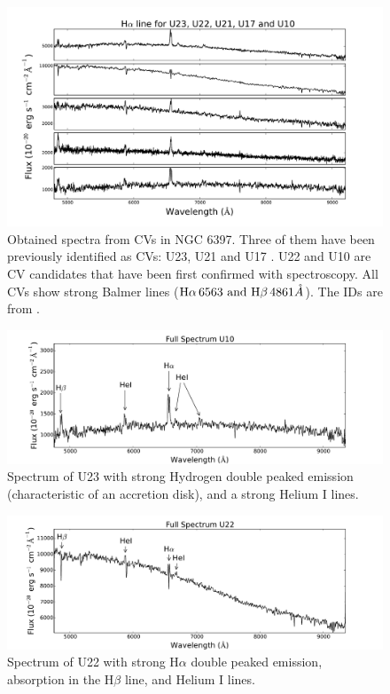 \begin{figure}[h]
        \centering
        \includegraphics[scale=.6]{assets/images/todostodos.pdf}
\caption{Obtained spectra from CVs in NGC 6397. Three of them have been previously identified as CVs: U23, U21 and U17 \citep{grindlay_spectroscopic_1995,edmonds_cataclysmic_1999}. U22 and  U10 are CV candidates that have been first confirmed with spectroscopy. All CVs show strong Balmer lines ($ \text H \alpha \, 6563 \text{ and H}\beta \,  4861 \mathring{ A}$). The IDs are from \citep{bogdanov_chandra_2010}.}
\label{fig:todosspectra}
\end{figure}

\begin{figure}[h]
        \centering
        \includegraphics[scale=.5]{assets/images/U10full.pdf}
\caption{Spectrum of U23 with strong Hydrogen double peaked emission (characteristic of an accretion disk), and a strong Helium I lines. }
\label{fig:U10spectra}
\end{figure}

\begin{figure}[h]
        \centering
        \includegraphics[scale=.5]{assets/images/U22full.pdf}
\caption{Spectrum of U22 with strong H$\alpha$ double peaked emission, absorption in the H$\beta$ line, and Helium I lines.}
\label{fig:U22spectra}
\end{figure}


